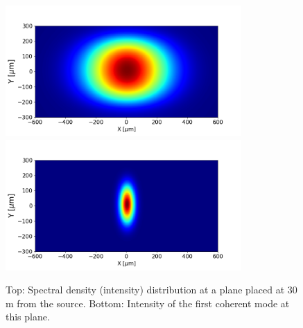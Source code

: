\documentclass{iucr}              %
\newcommand{\todo}[1]{{\color{red}[TODO: "#1'']}}
\newcommand{\inblue}[1]{{\color{blue}#1}}
\begin{document}
\begin{figure}\label{spectral_density_propagated}%
\caption{Top: Spectral density (intensity) distribution at a plane placed at 30 m from the source. Bottom: Intensity of the first coherent mode at this plane.}
\includegraphics[width=9.0cm]{Figures/spectral_density_upto1099_propagated.png}
\includegraphics[width=9.0cm]{Figures/spectral_density_upto0_propagated.png}
\end{figure}




% 
\end{document}
